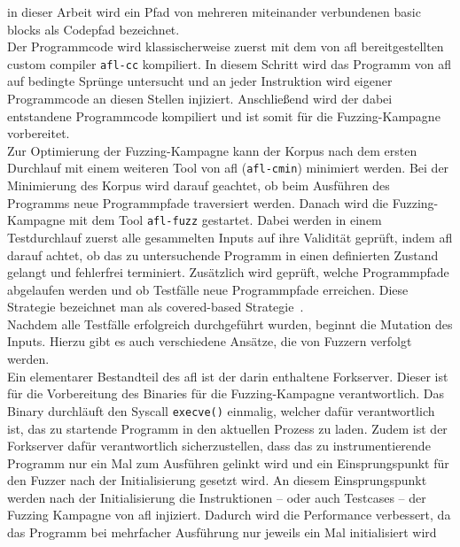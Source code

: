in dieser Arbeit wird ein Pfad von mehreren miteinander verbundenen basic blocks als Codepfad bezeichnet. \\
\linebreak
Der Programmcode wird klassischerweise zuerst mit dem von \gls{afl} bereitgestellten custom compiler \texttt{afl-cc} kompiliert.
In diesem Schritt wird das Programm von \gls{afl} auf bedingte Sprünge untersucht und an jeder Instruktion wird eigener
Programmcode an diesen Stellen injiziert.
Anschließend wird der dabei entstandene Programmcode kompiliert und ist somit für die Fuzzing-Kampagne vorbereitet. \\
\linebreak\linebreak
Zur Optimierung der Fuzzing-Kampagne kann der Korpus nach dem ersten Durchlauf mit einem weiteren Tool von \gls{afl}
(\texttt{afl-cmin}) minimiert werden.
Bei der Minimierung des Korpus wird darauf geachtet, ob beim Ausführen des Programms neue Programmpfade traversiert werden.
Danach wird die Fuzzing-Kampagne mit dem Tool \texttt{afl-fuzz} gestartet.
Dabei werden in einem Testdurchlauf zuerst alle gesammelten Inputs auf ihre Validität geprüft, indem \gls{afl} darauf
achtet, ob das zu untersuchende Programm in einen definierten Zustand gelangt und fehlerfrei terminiert.
Zusätzlich wird geprüft, welche Programmpfade abgelaufen werden und ob Testfälle neue Programmpfade erreichen.
Diese Strategie bezeichnet man als covered-based Strategie~\cite[vgl.][7]{iot-fuzzing}.\\
\linebreak
Nachdem alle Testfälle erfolgreich durchgeführt wurden, beginnt die Mutation des Inputs.
Hierzu gibt es auch verschiedene Ansätze, die von Fuzzern verfolgt werden.\\
Ein elementarer Bestandteil des \gls{afl} ist der darin enthaltene Forkserver.
Dieser ist für die Vorbereitung des Binaries für die Fuzzing-Kampagne verantwortlich.
Das Binary durchläuft den Syscall \texttt{execve()} einmalig, welcher dafür verantwortlich ist, das zu startende Programm in
den aktuellen Prozess zu laden.
Zudem ist der Forkserver dafür verantwortlich sicherzustellen, dass das zu instrumentierende Programm nur ein Mal
zum Ausführen gelinkt wird und ein Einsprungspunkt für den Fuzzer nach der Initialisierung gesetzt wird.
An diesem Einsprungspunkt werden nach der Initialisierung die Instruktionen -- oder auch Testcases -- der Fuzzing Kampagne von \gls{afl}
injiziert.
Dadurch wird die Performance verbessert, da das Programm bei mehrfacher Ausführung nur jeweils ein Mal initialisiert wird
